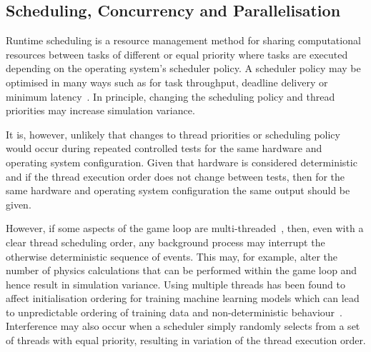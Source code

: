 \documentclass[runningheads,twocolumn,a4paper,10pt]{llncs}
\begin{document}
\subsection{Scheduling, Concurrency and Parallelisation}
Runtime scheduling is a resource management method for sharing computational resources between tasks of different or equal priority where tasks are executed depending on the operating system's scheduler policy. A scheduler policy may be optimised in many ways such as for task throughput, deadline delivery or minimum latency~\cite{liu1973scheduling}. 
%
In principle, changing the scheduling policy and thread priorities may increase simulation variance. 

It is, however, unlikely that changes to thread priorities or scheduling policy would occur during repeated controlled tests for the same hardware and operating system configuration. Given that hardware is considered deterministic and if the thread execution order does not change between tests, then for the same hardware and operating system configuration the same output should be given.  

However, if some aspects of the game loop are multi-threaded~\cite{unity_multithreading}, then, even with a clear thread scheduling order, any background process may interrupt the otherwise deterministic sequence of events. This may, for example, alter the number of physics calculations that can be performed within the game loop and hence result in simulation variance.
%
Using multiple threads has been found to affect initialisation ordering for training machine learning models which can lead to unpredictable ordering of training data and non-deterministic behaviour~\cite{Sculley2015,Breck2017}.
%
%
Interference may also occur when a scheduler simply randomly selects from a set of threads with equal priority, resulting in variation of the thread execution order.
\end{document}
